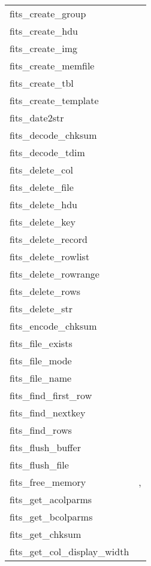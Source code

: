 \documentclass[11pt]{book}
\begin{document}
\begin{tabular}{lr}
fits\_create\_group  & \pageref{ffgtcr} \\
fits\_create\_hdu     & \pageref{ffcrhd} \\
fits\_create\_img     & \pageref{ffcrim} \\
fits\_create\_memfile    & \pageref{ffimem} \\
fits\_create\_tbl     & \pageref{ffcrtb} \\
fits\_create\_template & \pageref{fftplt} \\
fits\_date2str  & \pageref{ffdt2s} \\
fits\_decode\_chksum  & \pageref{ffdsum} \\
fits\_decode\_tdim    & \pageref{ffdtdm} \\
fits\_delete\_col   & \pageref{ffdcol} \\
fits\_delete\_file    & \pageref{ffdelt} \\
fits\_delete\_hdu     & \pageref{ffdhdu} \\
fits\_delete\_key     & \pageref{ffdkey} \\
fits\_delete\_record  & \pageref{ffdrec} \\
fits\_delete\_rowlist & \pageref{ffdrws} \\
fits\_delete\_rowrange & \pageref{ffdrrg} \\
fits\_delete\_rows  & \pageref{ffdrow} \\
fits\_delete\_str  & \pageref{ffdkey} \\
fits\_encode\_chksum  & \pageref{ffesum} \\
fits\_file\_exists    & \pageref{ffexist} \\
fits\_file\_mode      & \pageref{ffflmd} \\
fits\_file\_name      & \pageref{ffflnm} \\
fits\_find\_first\_row    & \pageref{ffffrw} \\
fits\_find\_nextkey      & \pageref{ffgnxk} \\
fits\_find\_rows    & \pageref{fffrow} \\
fits\_flush\_buffer     & \pageref{ffflus} \\
fits\_flush\_file     & \pageref{ffflus} \\
fits\_free\_memory   & \pageref{ffgkls},  \pageref{ffhdr2str} \\
fits\_get\_acolparms  & \pageref{ffgacl} \\
fits\_get\_bcolparms  & \pageref{ffgbcl} \\
fits\_get\_chksum     & \pageref{ffgcks} \\
fits\_get\_col\_display\_width    & \pageref{ffgcdw} \\
\end{tabular}
\end{document}

